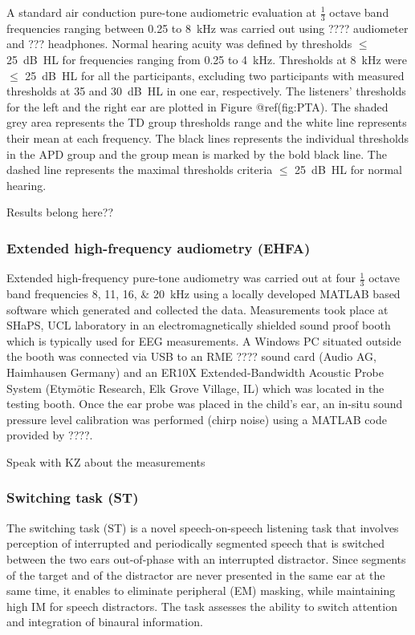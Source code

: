 \documentclass[a4paper,nobind]{templates/ociamthesis}
\begin{document}
A standard air conduction pure-tone audiometric evaluation at
\(\frac{1}{3}\) octave band frequencies ranging between 0.25 to 8~kHz
was carried out using ???? audiometer and ??? headphones. Normal hearing
acuity was defined by thresholds \(\leq\) 25~dB~HL for frequencies
ranging from 0.25 to 4~kHz. Thresholds at 8~kHz were \(\leq\) 25~dB~HL
for all the participants, excluding two participants with measured
thresholds at 35 and 30~dB~HL in one ear, respectively. The listeners'
thresholds for the left and the right ear are plotted in Figure
@ref(fig:PTA). The shaded grey area represents the TD group thresholds
range and the white line represents their mean at each frequency. The
black lines represents the individual thresholds in the APD group and
the group mean is marked by the bold black line. The dashed line
represents the maximal thresholds criteria \(\leq\) 25~dB~HL for normal
hearing.

{Results belong here??}

\hypertarget{extended-high-frequency-audiometry-ehfa}{%
\subsubsection{Extended high-frequency audiometry
(EHFA)}\label{extended-high-frequency-audiometry-ehfa}}

Extended high-frequency pure-tone audiometry was carried out at four
\(\frac{1}{3}\) octave band frequencies 8, 11, 16, \& 20~kHz using a
locally developed MATLAB based software which generated and collected
the data. Measurements took place at SHaPS, UCL laboratory in an
electromagnetically shielded sound proof booth which is typically used
for EEG measurements. A Windows PC situated outside the booth was
connected via USB to an RME ???? sound card (Audio AG, Haimhausen
Germany) and an ER10X Extended-Bandwidth Acoustic Probe System
(Etym\(\bar{o}\)tic Research, Elk Grove Village, IL) which was located
in the testing booth. Once the ear probe was placed in the child's ear,
an in-situ sound pressure level calibration was performed (chirp noise)
using a MATLAB code provided by ????.

Speak with KZ about the measurements

\hypertarget{switching-task-st}{%
\subsubsection{Switching task (ST)}\label{switching-task-st}}

The switching task (ST) is a novel speech-on-speech listening task that
involves perception of interrupted and periodically segmented speech
that is switched between the two ears out-of-phase with an interrupted
distractor. Since segments of the target and of the distractor are never
presented in the same ear at the same time, it enables to eliminate
peripheral (EM) masking, while maintaining high IM for speech
distractors. The task assesses the ability to switch attention and
integration of binaural information.
\end{document}
